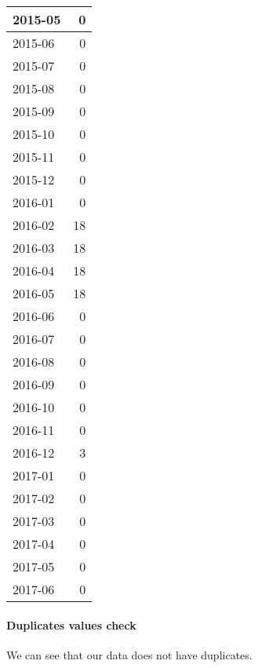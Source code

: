 \documentclass[
]{article}
\begin{document}
\begin{table}[H]
\begin{tabular}{l|r}
\hline
2015-05 & 0\\
\hline
2015-06 & 0\\
\hline
2015-07 & 0\\
\hline
2015-08 & 0\\
\hline
2015-09 & 0\\
\hline
2015-10 & 0\\
\hline
2015-11 & 0\\
\hline
2015-12 & 0\\
\hline
2016-01 & 0\\
\hline
2016-02 & 18\\
\hline
2016-03 & 18\\
\hline
2016-04 & 18\\
\hline
2016-05 & 18\\
\hline
2016-06 & 0\\
\hline
2016-07 & 0\\
\hline
2016-08 & 0\\
\hline
2016-09 & 0\\
\hline
2016-10 & 0\\
\hline
2016-11 & 0\\
\hline
2016-12 & 3\\
\hline
2017-01 & 0\\
\hline
2017-02 & 0\\
\hline
2017-03 & 0\\
\hline
2017-04 & 0\\
\hline
2017-05 & 0\\
\hline
2017-06 & 0\\
\hline
\end{tabular}
\end{table}

\hypertarget{duplicates-values-check}{%
\paragraph{Duplicates values check}\label{duplicates-values-check}}

We can see that our data does not have duplicates.
\end{document}
